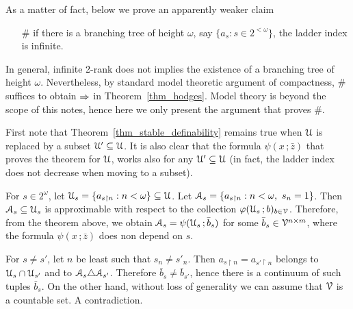 \documentclass[scombinatorics.tex]{subfiles}
\begin{document}
As a matter of fact, below we prove an apparently weaker claim
\begin{itemize}
  \item[\#] if there is a branching tree of height $\omega$, say $\{a_s:s\in2^{<\omega}\}$, the ladder index is infinite.
\end{itemize}
In general, infinite 2-rank does not implies the existence of a branching tree of height $\omega$.
Nevertheless, by standard model theoretic argument of compactness, \# suffices to obtain $\Rightarrow$ in Theorem~\ref{thm_hodges}.
Model theory is beyond the scope of this notes, hence here we only present the argument that proves \#.

First note that Theorem~\ref{thm_stable_definability} remains true when $\EuScript U$ is replaced by a subset $\EuScript U'\subseteq\EuScript U$.
It is also clear that the formula $\psi(x\,;\bar z)$ that proves the theorem for $\EuScript U$, works also for any $\EuScript U'\subseteq\EuScript U$ (in fact, the ladder index does not decrease when moving to a subset).

For $s\in2^\omega$, let $\EuScript U_s=\{a_{s\restriction n}:n<\omega\}\subseteq\EuScript U$.
Let $\Aa_s=\{a_{s\restriction n}:n<\omega,\ s_n=1\}$.
Then $\EuScript A_s\subseteq\EuScript U_s$ is approximable with respect to the collection $\varphi(\EuScript U_s\,;b)_{b\in\EuScript V}$.
Therefore, from the theorem above, we obtain $\EuScript A_s=\psi(\EuScript U_s\,;\bar b_s)$ for some  $\bar b_s\in\EuScript V^{n\times m}$, where the formula $\psi(x\,;\bar z)$ does non depend on $s$.

For $s\neq s'$, let $n$ be least such that $s_n\neq s'_n$.
Then $a_{s\restriction n}=a_{s'\restriction n}$ belongs to $\EuScript U_s\cap\EuScript U_{s'}$ and to $\EuScript A_s\triangle\EuScript A_{s'}$.
Therefore $\bar b_s\neq\bar b_{s'}$, hence there is a continuum of such tuples $\bar b_s$.
On the other hand, without loss of generality we can assume that $\EuScript V$ is a countable set. 
A contradiction. 


\end{document}
